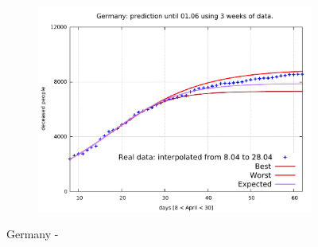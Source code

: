 \documentclass[8pt]{article}
\begin{document}
\begin{figure}[h!]
\begin{subfigure}[b]{0.45\linewidth}
  \includegraphics[width=\linewidth]{../err100p_simulations/de/8-28/8-28.pdf}
  \end{subfigure}
	\caption{Germany -}
\end{figure}
\end{document}
